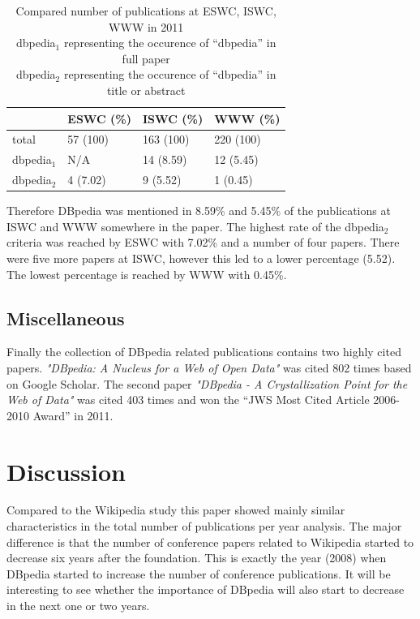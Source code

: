 \documentclass[english]{lni}
\begin{document}
\begin{table}[htb]
\caption{\centering Compared number of publications at ESWC, ISWC, WWW in 2011 \\dbpedia$_1$ representing the occurence of ``dbpedia'' in full paper \\dbpedia$_2$ representing the occurence of ``dbpedia'' in title or abstract} \label{tab:vergleich}
\begin{center}
\begin{tabular}{llll}
\hline
              &  ESWC (\%)  &  ISWC (\%)  &  WWW (\%)   \\
\hline
 total        &  57 (100)   &  163 (100)  &  220 (100)  \\
 dbpedia$_1$  &  N/A        &  14 (8.59)  &  12 (5.45)  \\
 dbpedia$_2$  &  4 (7.02)   &  9 (5.52)   &  1 (0.45)   \\
\hline
\end{tabular}
\end{center}
\end{table}


   Therefore DBpedia was mentioned in 8.59\% and 5.45\% of the publications at
   ISWC and WWW somewhere in the paper. The highest rate of the dbpedia$_2$
   criteria was reached by ESWC with 7.02\% and a number of four papers. There
   were five more papers at ISWC, however this led to a lower percentage
   (5.52). The lowest percentage is reached by WWW with 0.45\%.
\subsection{Miscellaneous}
\label{sec-3-4}

   Finally the collection of DBpedia related publications contains two highly
   cited papers. \textit{"DBpedia: A Nucleus for a Web of Open Data"} \cite{auer2007dbpedia} was cited 802
   times based on Google Scholar. The second paper \textit{"DBpedia - A Crystallization
   Point for the Web of Data"} \cite{bizer2009dbpedia} was cited 403 times and won the ``JWS Most Cited
   Article 2006-2010 Award'' in 2011.

\newpage
\section{Discussion}
\label{sec-4}


  Compared to the Wikipedia study this paper showed mainly similar
  characteristics in the total number of publications per year analysis. The
  major difference is that the number of conference papers related to Wikipedia
  started to decrease six years after the foundation. This is exactly the year
  (2008) when DBpedia started to increase the number of conference
  publications. It will be interesting to see whether the importance of DBpedia
  will also start to decrease in the next one or two years.
\end{document}
